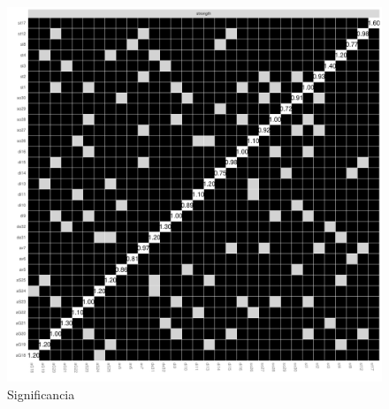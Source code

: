 \documentclass[11pt,spanish]{article}\usepackage[]{graphicx}\usepackage[]{color}
\begin{document}
\begin{figure}[ht]
\centering
\includegraphics[scale=0.5]{images/signif_2i_todo.pdf}
\caption{Significancia}
\label{fig:sintodo}
\end{figure}




\newpage



\end{document}

